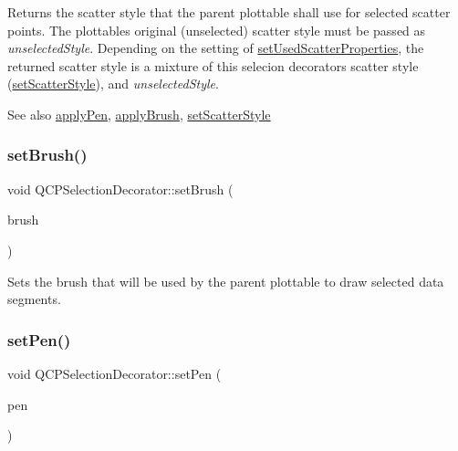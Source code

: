 Returns the scatter style that the parent plottable shall use for selected scatter points. The plottable\textquotesingle{}s original (unselected) scatter style must be passed as {\itshape unselected\+Style}. Depending on the setting of \hyperlink{classQCPSelectionDecorator_a808c1607cd4e83869c04986e332455c0}{set\+Used\+Scatter\+Properties}, the returned scatter style is a mixture of this selecion decorator\textquotesingle{}s scatter style (\hyperlink{classQCPSelectionDecorator_ab403a613289714ff4fd4a0c0371ab116}{set\+Scatter\+Style}), and {\itshape unselected\+Style}.

\begin{DoxySeeAlso}{See also}
\hyperlink{classQCPSelectionDecorator_a75098893f7d08660ea449206810679d7}{apply\+Pen}, \hyperlink{classQCPSelectionDecorator_a225544527d51b49546b70d0e6d655a34}{apply\+Brush}, \hyperlink{classQCPSelectionDecorator_ab403a613289714ff4fd4a0c0371ab116}{set\+Scatter\+Style} 
\end{DoxySeeAlso}
\mbox{\label{classQCPSelectionDecorator_aa74b626be518ea17055f918d423c8c2d}} 
\subsubsection{\texorpdfstring{set\+Brush()}{setBrush()}}
{\footnotesize\ttfamily void Q\+C\+P\+Selection\+Decorator\+::set\+Brush (\begin{DoxyParamCaption}\item[{const Q\+Brush \&}]{brush }\end{DoxyParamCaption})}

Sets the brush that will be used by the parent plottable to draw selected data segments. \mbox{\label{classQCPSelectionDecorator_ac2c8192e1e294aa3a4a7f32a859e3d76}} 
\subsubsection{\texorpdfstring{set\+Pen()}{setPen()}}
{\footnotesize\ttfamily void Q\+C\+P\+Selection\+Decorator\+::set\+Pen (\begin{DoxyParamCaption}\item[{const Q\+Pen \&}]{pen }\end{DoxyParamCaption})}

